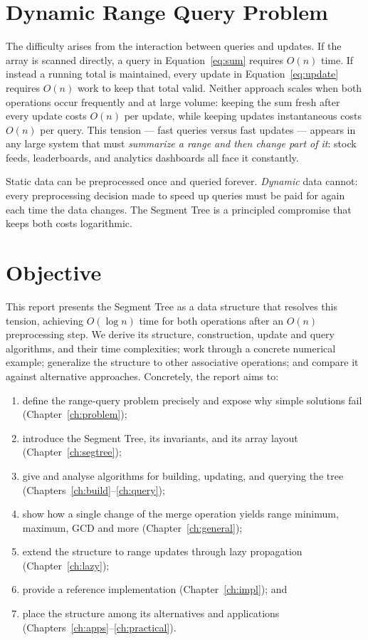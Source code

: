 \section{Dynamic Range Query Problem}
The difficulty arises from the interaction between queries and updates. If the array is scanned directly, a query in Equation~\eqref{eq:sum} requires $O(n)$ time. If instead a running total is maintained, every update in Equation~\eqref{eq:update} requires $O(n)$ work to keep that total valid. Neither approach scales when both operations occur frequently and at large volume: keeping the sum fresh after every update costs $O(n)$ per update, while keeping updates instantaneous costs $O(n)$ per query. This tension --- fast queries versus fast updates --- appears in any large system that must \emph{summarize a range and then change part of it}: stock feeds, leaderboards, and analytics dashboards all face it constantly.

\begin{keyidea}
Static data can be preprocessed once and queried forever. \emph{Dynamic} data cannot: every preprocessing decision made to speed up queries must be paid for again each time the data changes. The Segment Tree is a principled compromise that keeps both costs logarithmic.
\end{keyidea}

\section{Objective}
This report presents the Segment Tree as a data structure that resolves this tension, achieving $O(\log n)$ time for both operations after an $O(n)$ preprocessing step. We derive its structure, construction, update and query algorithms, and their time complexities; work through a concrete numerical example; generalize the structure to other associative operations; and compare it against alternative approaches. Concretely, the report aims to:

\begin{enumerate}[nosep]
  \item define the range-query problem precisely and expose why simple solutions fail (Chapter~\ref{ch:problem});
  \item introduce the Segment Tree, its invariants, and its array layout (Chapter~\ref{ch:segtree});
  \item give and analyse algorithms for building, updating, and querying the tree (Chapters~\ref{ch:build}--\ref{ch:query});
  \item show how a single change of the merge operation yields range minimum, maximum, GCD and more (Chapter~\ref{ch:general});
  \item extend the structure to range updates through lazy propagation (Chapter~\ref{ch:lazy});
  \item provide a reference implementation (Chapter~\ref{ch:impl}); and
  \item place the structure among its alternatives and applications (Chapters~\ref{ch:apps}--\ref{ch:practical}).
\end{enumerate}

